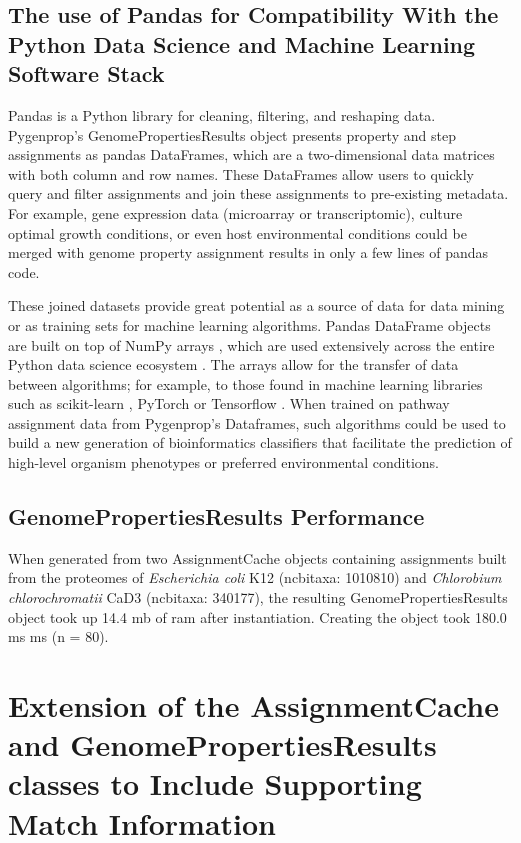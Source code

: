 \subsection{The use of Pandas for Compatibility With the Python Data Science and 
Machine Learning Software Stack}

Pandas is a Python library for cleaning, filtering, and reshaping data. 
Pygenprop's GenomePropertiesResults object presents property and step 
assignments as pandas DataFrames, which are a two-dimensional data matrices with 
both column and row names. These DataFrames allow users to quickly query and 
filter assignments and join these assignments to pre-existing metadata. For 
example, gene expression data (microarray or transcriptomic), culture optimal 
growth conditions, or even host environmental conditions could be merged with 
genome property assignment results in only a few lines of pandas code.

These joined datasets provide great potential as a source of data for data 
mining or as training sets for machine learning algorithms. Pandas DataFrame 
objects are built on top of NumPy arrays \cite{mckinney2010data}, which are used 
extensively across the entire Python data science ecosystem \cite{scipystack}. 
The arrays allow for the transfer of data between algorithms; for example, to 
those found in machine learning libraries such as \gls{scikit}-learn 
\cite{pedregosa2011scikit}, PyTorch \cite{Paszke2017} or Tensorflow 
\cite{abadi2016tensorflow}.  When trained on pathway assignment data from 
Pygenprop's Dataframes, such algorithms could be used to build a new generation 
of bioinformatics classifiers that facilitate the prediction of high-level 
organism phenotypes or preferred environmental conditions.

\subsection{GenomePropertiesResults Performance}

When generated from two AssignmentCache objects containing assignments built 
from the proteomes of \textit{Escherichia coli} K12 (\gls{ncbitaxa}: 1010810) 
and \textit{Chlorobium chlorochromatii} CaD3 (\gls{ncbitaxa}: 340177), the 
resulting GenomePropertiesResults object took up 14.4 \gls{mb} of \gls{ram} 
after instantiation. Creating the object took 180.0 ms  ms (\gls{n} = 80). 

\section{Extension of the AssignmentCache and GenomePropertiesResults classes to 
Include Supporting Match Information}

